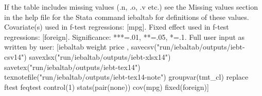 If the table includes missing values (.n, .o, .v etc.) see the Missing values section in the help file for the Stata command iebaltab for definitions of these values. Covariate(s) used in f-test regressions: [mpg]. Fixed effect used in f-test regressions: [foreign]. Significance: ***=.01, **=.05, *=.1. Full user input as written by user: [iebaltab weight price , savecsv("run/iebaltab/outputs/iebt-csv14") savexlsx("run/iebaltab/outputs/iebt-xlsx14") savetex("run/iebaltab/outputs/iebt-tex14") texnotefile("run/iebaltab/outputs/iebt-tex14-note") groupvar(tmt\_cl) replace ftest feqtest control(1) stats(pair(none)) cov(mpg) fixed(foreign)] 
